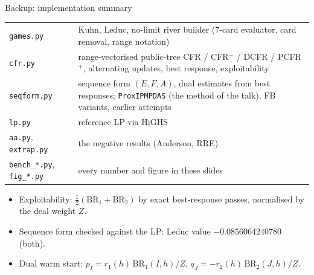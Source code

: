 \documentclass[10pt,aspectratio=169]{beamer}
\begin{document}
\appendix
\begin{frame}{Backup: implementation summary}
\small
\begin{tabular}{@{}lp{10.5cm}@{}}
\toprule
\texttt{games.py} & Kuhn, Leduc, no-limit river builder (7-card evaluator, card removal, range notation) \\
\texttt{cfr.py} & range-vectorised public-tree CFR / CFR$^+$ / DCFR / PCFR$^+$, alternating updates, best response, exploitability \\
\texttt{seqform.py} & sequence form $(E,F,A)$, dual estimates from best responses; \texttt{ProxIPMPDAS} (the method of the talk), FB variants, earlier attempts \\
\texttt{lp.py} & reference LP via HiGHS \\
\texttt{aa.py}, \texttt{extrap.py} & the negative results (Anderson, RRE) \\
\texttt{bench\_*.py}, \texttt{fig\_*.py} & every number and figure in these slides \\ \bottomrule
\end{tabular}
\vspace{8pt}
\begin{itemize}\small
\item Exploitability: $\tfrac12(\mathrm{BR}_1 + \mathrm{BR}_2)$ by exact best-response passes, normalised by the deal weight $Z$.
\item Sequence form checked against the LP: Leduc value $-0.0856064240780$ (both).
\item Dual warm start: $p_I = r_1(h)\,\mathrm{BR}_1(I,h)/Z$, $q_J = -r_2(h)\,\mathrm{BR}_2(J,h)/Z$.
\end{itemize}
\end{frame}
\end{document}

